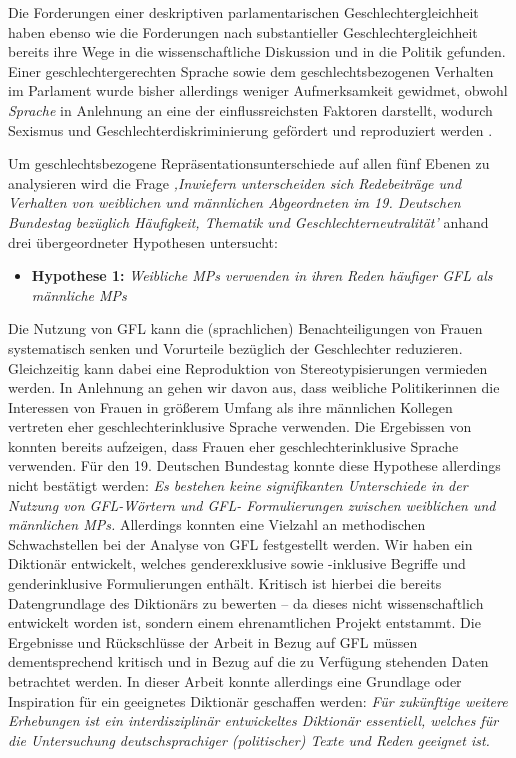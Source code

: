 \documentclass[12pt, 
    twoside=false, 
    bibliography=totoc, 
    numbers=endperiod, 
    headings=normal, 
    toc=chapterentrydotfill
    ]{scrbook}
\begin{document}
Die Forderungen einer deskriptiven parlamentarischen Geschlechtergleichheit haben ebenso wie die Forderungen nach substantieller Geschlechtergleichheit bereits ihre Wege in die wissenschaftliche Diskussion und in die Politik gefunden. Einer geschlechtergerechten Sprache sowie dem geschlechtsbezogenen Verhalten im Parlament wurde bisher allerdings weniger Aufmerksamkeit gewidmet, obwohl \emph{Sprache} in Anlehnung an \textcite{menegatti_2017} eine der einflussreichsten Faktoren darstellt, wodurch Sexismus und Geschlechterdiskriminierung gefördert und reproduziert werden \parencite*[1]{menegatti_2017}.

Um geschlechtsbezogene Repräsentationsunterschiede auf allen fünf Ebenen zu analysieren wird die Frage \emph{‚Inwiefern unterscheiden sich Redebeiträge und Verhalten von weiblichen und männlichen Abgeordneten im 19. Deutschen Bundestag bezüglich Häufigkeit, Thematik und Geschlechterneutralität'} anhand drei übergeordneter Hypothesen untersucht:

\begin{itemize}
    \item \textbf{Hypothese 1:} \emph{Weibliche MPs verwenden in ihren Reden häufiger GFL als männliche MPs}
     \end{itemize}

Die Nutzung von GFL kann die (sprachlichen) Benachteiligungen von Frauen systematisch senken und Vorurteile bezüglich der Geschlechter reduzieren. Gleichzeitig kann dabei eine Reproduktion von Stereotypisierungen vermieden werden. In Anlehnung an \textcite{wangnerud_2000} gehen wir davon aus, dass weibliche Politikerinnen die Interessen von Frauen in größerem Umfang als ihre männlichen Kollegen vertreten \parencite[69f.]{wangnerud_2000} eher geschlechterinklusive Sprache verwenden. Die Ergebissen von \textcite{koeser_2014} konnten bereits aufzeigen, dass Frauen eher geschlechterinklusive Sprache verwenden. Für den 19. Deutschen Bundestag konnte diese Hypothese allerdings nicht bestätigt werden: \emph{Es bestehen keine signifikanten Unterschiede in der Nutzung von GFL-Wörtern und GFL- Formulierungen zwischen weiblichen und männlichen MPs.} Allerdings konnten eine Vielzahl an methodischen Schwachstellen bei der Analyse von GFL festgestellt werden. Wir haben ein Diktionär entwickelt, welches genderexklusive sowie -inklusive Begriffe und genderinklusive Formulierungen enthält. Kritisch ist hierbei die bereits Datengrundlage des Diktionärs zu bewerten -- da dieses nicht wissenschaftlich entwickelt worden ist, sondern einem ehrenamtlichen Projekt entstammt. Die Ergebnisse und Rückschlüsse der Arbeit in Bezug auf GFL müssen dementsprechend kritisch und in Bezug auf die zu Verfügung stehenden Daten betrachtet werden. In dieser Arbeit konnte allerdings eine Grundlage oder Inspiration für ein geeignetes Diktionär geschaffen werden: \emph{Für zukünftige weitere Erhebungen ist ein interdisziplinär entwickeltes Diktionär essentiell, welches für die Untersuchung deutschsprachiger (politischer) Texte und Reden geeignet ist.}
\end{document}
